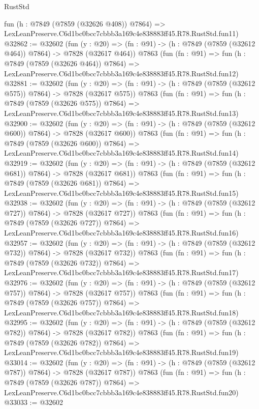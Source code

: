 \begin{lexlean}{RustStd}
\begin{coremodule}
    fun (h : @7849 (@7859 (@32626 @408)) @7864) =>
    LexLeanPreserve.C6d1bc0bcc7cbbb3a169c4e838883ff45.R78.RustStd.fun11)
@32862 := @32602
    (fun (y : @20) => (fn : @91) -> (h : @7849 (@7859 (@32612 @464)) @7864) -> @7828 (@32617 @464))
    @7863
    (fun (fn : @91) =>
    fun (h : @7849 (@7859 (@32626 @464)) @7864) =>
    LexLeanPreserve.C6d1bc0bcc7cbbb3a169c4e838883ff45.R78.RustStd.fun12)
@32881 := @32602
    (fun (y : @20) => (fn : @91) -> (h : @7849 (@7859 (@32612 @575)) @7864) -> @7828 (@32617 @575))
    @7863
    (fun (fn : @91) =>
    fun (h : @7849 (@7859 (@32626 @575)) @7864) =>
    LexLeanPreserve.C6d1bc0bcc7cbbb3a169c4e838883ff45.R78.RustStd.fun13)
@32900 := @32602
    (fun (y : @20) => (fn : @91) -> (h : @7849 (@7859 (@32612 @600)) @7864) -> @7828 (@32617 @600))
    @7863
    (fun (fn : @91) =>
    fun (h : @7849 (@7859 (@32626 @600)) @7864) =>
    LexLeanPreserve.C6d1bc0bcc7cbbb3a169c4e838883ff45.R78.RustStd.fun14)
@32919 := @32602
    (fun (y : @20) => (fn : @91) -> (h : @7849 (@7859 (@32612 @681)) @7864) -> @7828 (@32617 @681))
    @7863
    (fun (fn : @91) =>
    fun (h : @7849 (@7859 (@32626 @681)) @7864) =>
    LexLeanPreserve.C6d1bc0bcc7cbbb3a169c4e838883ff45.R78.RustStd.fun15)
@32938 := @32602
    (fun (y : @20) => (fn : @91) -> (h : @7849 (@7859 (@32612 @727)) @7864) -> @7828 (@32617 @727))
    @7863
    (fun (fn : @91) =>
    fun (h : @7849 (@7859 (@32626 @727)) @7864) =>
    LexLeanPreserve.C6d1bc0bcc7cbbb3a169c4e838883ff45.R78.RustStd.fun16)
@32957 := @32602
    (fun (y : @20) => (fn : @91) -> (h : @7849 (@7859 (@32612 @732)) @7864) -> @7828 (@32617 @732))
    @7863
    (fun (fn : @91) =>
    fun (h : @7849 (@7859 (@32626 @732)) @7864) =>
    LexLeanPreserve.C6d1bc0bcc7cbbb3a169c4e838883ff45.R78.RustStd.fun17)
@32976 := @32602
    (fun (y : @20) => (fn : @91) -> (h : @7849 (@7859 (@32612 @757)) @7864) -> @7828 (@32617 @757))
    @7863
    (fun (fn : @91) =>
    fun (h : @7849 (@7859 (@32626 @757)) @7864) =>
    LexLeanPreserve.C6d1bc0bcc7cbbb3a169c4e838883ff45.R78.RustStd.fun18)
@32995 := @32602
    (fun (y : @20) => (fn : @91) -> (h : @7849 (@7859 (@32612 @782)) @7864) -> @7828 (@32617 @782))
    @7863
    (fun (fn : @91) =>
    fun (h : @7849 (@7859 (@32626 @782)) @7864) =>
    LexLeanPreserve.C6d1bc0bcc7cbbb3a169c4e838883ff45.R78.RustStd.fun19)
@33014 := @32602
    (fun (y : @20) => (fn : @91) -> (h : @7849 (@7859 (@32612 @787)) @7864) -> @7828 (@32617 @787))
    @7863
    (fun (fn : @91) =>
    fun (h : @7849 (@7859 (@32626 @787)) @7864) =>
    LexLeanPreserve.C6d1bc0bcc7cbbb3a169c4e838883ff45.R78.RustStd.fun20)
@33033 := @32602

\end{coremodule}
\end{lexlean}

